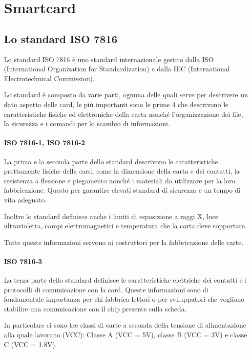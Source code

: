 \chapter{Smartcard}
\label{chapter2}

\section{Lo standard ISO 7816}
\label{standard}

Lo standard ISO 7816 è uno standard internazionale gestito dalla ISO (International Organization for Standardization) e dalla IEC (International Electrotechnical Commission).

Lo standard è composto da varie parti, ognuna delle quali serve per descrivere un dato aspetto delle card, le più importanti sono le prime 4 che descrivono le caratteristiche fisiche ed elettroniche della carta nonché l'organizzazione dei file, la sicurezza e i comandi per lo scambio di informazioni.
\cite{wiki_iso}

\subsubsection{ISO 7816-1, ISO 7816-2}
La prima e la seconda parte dello standard descrivono le caratteristiche prettamente fisiche della card, come la dimensione della carta e dei contatti, la resistenza a flessione e piegamento nonché i materiali da utilizzare per la loro fabbricazione. Questo per garantire elevati standard di sicurezza e un tempo di vita adeguato.

Inoltre lo standard definisce anche i limiti di esposizione a raggi X, luce ultravioletta, campi elettromagnetici e temperatura che la carta deve sopportare.

Tutte queste informazioni servono ai costruttori per la fabbricazione delle carte.
\cite{iso}

\subsubsection{ISO 7816-3}
La terza parte dello standard definisce le caratteristiche elettriche dei contatti e i protocolli di comunicazione con la card. Queste informazioni sono di fondamentale importanza per chi fabbrica lettori o per sviluppatori che vogliono stabilire una comunicazione con il chip presente sulla scheda.
\cite{iso}

In particolare ci sono tre classi di carte a seconda della tensione di alimentazione alla quale lavorano (VCC): Classe A (VCC = 5V), classe B (VCC = 3V) e classe C (VCC = 1.8V).

